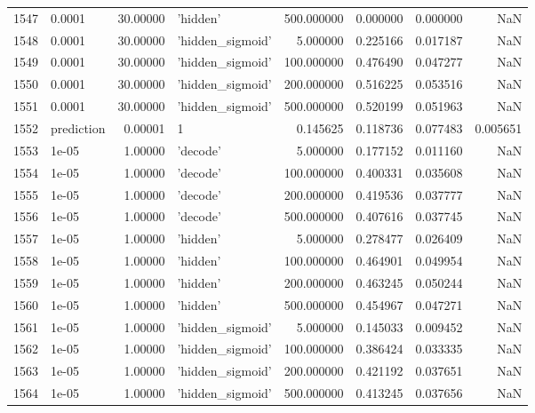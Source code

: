 \documentclass[10pt,a4paper]{article}
\begin{document}
\begin{tabular}{llrlrrrr}
1547 &      0.0001 &  30.00000 &           'hidden' &  500.000000 &  0.000000 &  0.000000 &       NaN \\
1548 &      0.0001 &  30.00000 &   'hidden\_sigmoid' &    5.000000 &  0.225166 &  0.017187 &       NaN \\
1549 &      0.0001 &  30.00000 &   'hidden\_sigmoid' &  100.000000 &  0.476490 &  0.047277 &       NaN \\
1550 &      0.0001 &  30.00000 &   'hidden\_sigmoid' &  200.000000 &  0.516225 &  0.053516 &       NaN \\
1551 &      0.0001 &  30.00000 &   'hidden\_sigmoid' &  500.000000 &  0.520199 &  0.051963 &       NaN \\
1552 &  prediction &   0.00001 &                  1 &    0.145625 &  0.118736 &  0.077483 &  0.005651 \\
1553 &       1e-05 &   1.00000 &           'decode' &    5.000000 &  0.177152 &  0.011160 &       NaN \\
1554 &       1e-05 &   1.00000 &           'decode' &  100.000000 &  0.400331 &  0.035608 &       NaN \\
1555 &       1e-05 &   1.00000 &           'decode' &  200.000000 &  0.419536 &  0.037777 &       NaN \\
1556 &       1e-05 &   1.00000 &           'decode' &  500.000000 &  0.407616 &  0.037745 &       NaN \\
1557 &       1e-05 &   1.00000 &           'hidden' &    5.000000 &  0.278477 &  0.026409 &       NaN \\
1558 &       1e-05 &   1.00000 &           'hidden' &  100.000000 &  0.464901 &  0.049954 &       NaN \\
1559 &       1e-05 &   1.00000 &           'hidden' &  200.000000 &  0.463245 &  0.050244 &       NaN \\
1560 &       1e-05 &   1.00000 &           'hidden' &  500.000000 &  0.454967 &  0.047271 &       NaN \\
1561 &       1e-05 &   1.00000 &   'hidden\_sigmoid' &    5.000000 &  0.145033 &  0.009452 &       NaN \\
1562 &       1e-05 &   1.00000 &   'hidden\_sigmoid' &  100.000000 &  0.386424 &  0.033335 &       NaN \\
1563 &       1e-05 &   1.00000 &   'hidden\_sigmoid' &  200.000000 &  0.421192 &  0.037651 &       NaN \\
1564 &       1e-05 &   1.00000 &   'hidden\_sigmoid' &  500.000000 &  0.413245 &  0.037656 &       NaN \\

\end{tabular}
\end{document}
